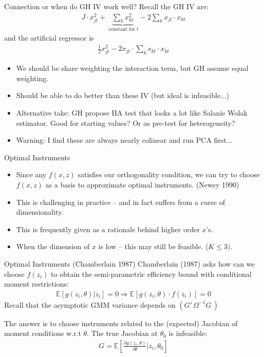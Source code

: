 \documentclass[aspectratio=169,10pt]{beamer}
\begin{document}
\begin{frame}{Connection or when do GH IV work well?}
Recall the GH IV are:
\begin{align*}
J \cdot x_{jt}^2 + \underbrace{\sum_k x_{kt}^2}_{\text{ constant for } t } - 2 \sum_k x_{jt} \cdot x_{kt}
\end{align*}
and the artificial regressor is
\begin{align*}
\frac{1}{2} x_{jt}^2 - 2 x_{jt} \cdot \sum_k s_{kt}  \cdot x_{kt}
\end{align*}
\begin{itemize}
\item We should be \alert{share weighting} the interaction term, but GH assume equal weighting.\\
\item Should be able to do better than these IV (but ideal is infeasible...)
\item Alternative take: GH propose IIA test that looks a lot like Salanie Wolak estimator. Good for starting values? Or as pre-test for heterogeneity?
\item Warning: I find these are always nearly colinear and run PCA first...
\end{itemize}
\end{frame}


\begin{frame}{Optimal Instruments}
\begin{itemize}
\item Since any $f(x,z)$ satisfies our orthogonality condition, we can try to choose $f(x,z)$ as a \alert{basis} to approximate optimal instruments. (Newey 1990)
\item This is challenging in practice -- and in fact suffers from a curse of dimensionality.
\item This is frequently given as a rationale behind higher order $x$'s.
\item When the dimension of $x$ is low -- this may still be feasible. ($K \leq 3)$.
\end{itemize}
\end{frame}



\begin{frame}{Optimal Instruments (Chamberlain 1987)}
Chamberlain (1987) asks how can we choose $f(z_i)$ to obtain the semi-parametric efficiency bound with conditional moment restrictions:
\begin{align*}
\mathbb{E}[g(z_i,\theta) | z_i]=0 \Rightarrow \mathbb{E}[g(z_i,\theta) \cdot f(z_i) ]=0 
\end{align*}
Recall that the asymptotic GMM variance depends on $(G'\, \Omega^{-1} G\,)$

The answer is to choose instruments related to the (expected) Jacobian of moment conditions w.r.t $\theta$. The true Jacobian at $\theta_0$ is \alert{infeasible}:
\begin{align*}
G=\mathbb{E}\left[\frac{\partial g(z_i,\theta)}{\partial \theta} | z_i, \theta_0 \right]
\end{align*}
\end{frame}
\end{document}

